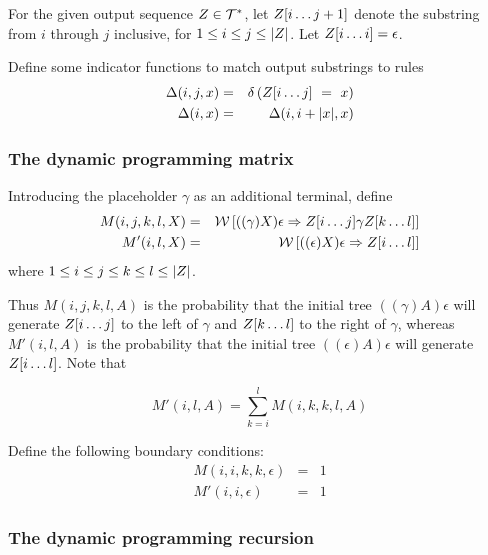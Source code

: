 \documentclass[10pt]{article}
\begin{document}
For the given output sequence $Z \in {\cal T}^\ast$, let $Z[i \ldots j+1]$ denote the substring from $i$ through $j$ inclusive, for $1 \leq i \leq j \leq |Z|$.
Let $Z[i \ldots i] = \epsilon$.

Define some indicator functions to match output substrings to rules
\begin{eqnarray*}
\Delta(i,j,x) & = & \delta \left( Z[i \ldots j]\ =\ x \right) \\
\Delta(i,x) & = & \Delta(i,i+|x|,x)
\end{eqnarray*}

\subsubsection{The dynamic programming matrix}

\newcommand\m{M}
\newcommand\mtip{\m'}

Introducing the placeholder $\gamma$ as an additional terminal, define
\begin{eqnarray*}
\m(i,j,k,l,X) & = & \seqweight{((\gamma)X)\epsilon}{\outsubseq{i}{j} \gamma \outsubseq{k}{l}} \\
\mtip(i,l,X) & = & \seqweight{((\epsilon)X)\epsilon}{\outsubseq{i}{l}}
\end{eqnarray*}
where $1 \leq i \leq j \leq k \leq l \leq |Z|$.

Thus $\m(i,j,k,l,A)$ is the probability that the initial tree $((\gamma)A)\epsilon$ will generate 
$Z[i \ldots j]$ to the left of $\gamma$ and $Z[k \ldots l]$ to the right of $\gamma$,
whereas $\mtip(i,l,A)$ is the probability that the initial tree $((\epsilon)A)\epsilon$ will generate 
$Z[i \ldots l]$.
Note that

\[
\mtip(i,l,A) = \sum_{k=i}^l \m(i,k,k,l,A)
\]

Define the following boundary conditions:
\begin{eqnarray*}
\m(i,i,k,k,\epsilon) & = & 1 \\
\mtip(i,i,\epsilon) & = & 1
\end{eqnarray*}


\subsubsection{The dynamic programming recursion}
\end{document}
